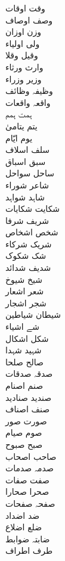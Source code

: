 \documentclass[a4paper]{article}
\begin{document}
\begin{multicols}{3}
\begin{tabbing}
وقت \> اوقات\\
وصف \> اوصاف\\
وزن \> اوزان\\
ولی \> اولیاء\\
وقیل \> وقلا\\
وارث \> ورثاء\\
وزیر \> وزراء\\
وظیفہ \> وظائف\\
واقعہ \> واقعات\\
ہمت \> ہمم\\
یتم \> یتامیٰ\\
یوم \> ایّام\\
سلف \> اسلاف\\
سبق \> اسباق\\
ساحل \> سواحل\\
شاعر \> شوراء\\
شاہد \> شواہد\\
شکایت \> شکایات\\
شریف \> شرفا\\
شخص \> اشخاص\\
شریک \> شرکاء\\
شک \> شکوک\\
شدیف \> شدائد\\
شیخ \> شیوخ\\
شعر \> اشعار\\
شجر \> اشجار\\
شیطان \> شیاطین\\
شے \> اشیاء\\
شکل \> اشکال\\
شہید \> شہدا\\
صالح \> صلحا\\
صدقہ \> صدقات\\
صنم \> اصنام\\
صندید \> صنادید\\
صنف \> اصناف\\
صورت \> صور\\
صوم \> صیام\\
صبح \> صبوح\\
صاحب \> اصحاب\\
صدمہ \> صدمات\\
صفت \> صفات\\
صحرا \> صحارا\\
صفحہ \> صفحات\\
ضد \> اضداد\\
ضلع \> اضلاع\\
ضابتہ \> ضوابط\\
طرف \> اطراف\\

\end{tabbing}
\end{multicols}
\end{document}
